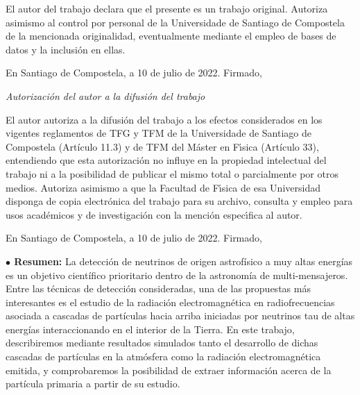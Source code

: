 \documentclass[11 pt, a4paper]{article} %
\numberwithin{equation}{section}
\numberwithin{figure}{section}
\numberwithin{table}{section}
\begin{document}
	El autor del trabajo declara que el presente es un trabajo original. Autoriza asimismo al control por personal de la Universidade de Santiago de Compostela de la mencionada originalidad, eventualmente mediante el empleo de bases de datos y la inclusi\'on en ellas.
	
	En Santiago de Compostela, a 10 de julio de 2022. Firmado,\vspace{3cm}
	
	
	{\sl Autorizaci\'on del autor a la difusi\'on del trabajo}
	
	 El autor autoriza a la difusi\'on del trabajo a los efectos considerados en los vigentes reglamentos de TFG y TFM de la Universidade de Santiago de Compostela (Artículo 11.3) y de TFM del M\'aster en F\'{\i}sica (Artículo 33), entendiendo que esta autorizaci\'on no influye en la propiedad intelectual del trabajo ni a la posibilidad de publicar el mismo total o parcialmente por otros medios. Autoriza asimismo a que la Facultad de F\'{\i}sica de esa Universidad disponga de copia electr\'onica del trabajo para su archivo, consulta y empleo para usos acad\'emicos y de investigaci\'on con la menci\'on espec\'{\i}fica al autor. 
	
	En Santiago de Compostela, a 10 de julio de 2022. Firmado,\
	
	\thispagestyle{empty}
	\pagebreak

	\thispagestyle{empty} %
	\pagebreak
	
		\begin{flushleft}  {\bf $\bullet$ Resumen:\;\;}
		La detección de neutrinos de origen astrofísico a muy altas energías es un objetivo científico prioritario dentro de la astronomía de multi-mensajeros. Entre las técnicas de detección consideradas, una de las propuestas más interesantes es el estudio de la radiación electromagnética en radiofrecuencias asociada a cascadas de partículas hacia arriba iniciadas por neutrinos tau de altas energías interaccionando en el interior de la Tierra. En este trabajo, describiremos mediante resultados simulados tanto el desarrollo de dichas cascadas de partículas en la atmósfera como la radiación electromagnética emitida, y comprobaremos la posibilidad de extraer información acerca de la partícula primaria a partir de su estudio.
	\end{flushleft}\mbox{}
\end{document}
